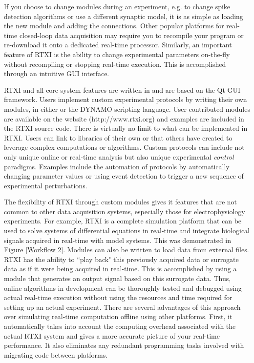  If you choose to change modules during an experiment, e.g. to change spike detection algorithms or use a different synaptic model, it is as simple as loading the new module and adding the connections. Other popular platforms for real-time closed-loop data acquisition may require you to recompile your program or re-download it onto a dedicated real-time processor. Similarly, an important feature of RTXI is the ability to change experimental parameters on-the-fly without recompiling or stopping real-time execution. This is accomplished through an intuitive GUI interface.

RTXI and all core system features are written in \cpp and are based on the Qt GUI framework. Users implement custom experimental protocols by writing their own modules, in either \cpp or the DYNAMO scripting language. User-contributed modules are available on the website (http://www.rtxi.org) and examples are included in the RTXI source code. There is virtually no limit to what can be implemented in RTXI. Users can link to \cpp libraries of their own or that others have created to leverage complex computations or algorithms. Custom protocols can include not only unique online or real-time analysis but also unique experimental \emph{control} paradigms. Examples include the automation of protocols by automatically changing parameter values or using event detection to trigger a new sequence of experimental perturbations. 

The flexibility of RTXI through custom \cpp modules gives it features that are not common to other data acquisition systems, especially those for electrophysiology experiments. For example, RTXI is a complete simulation platform that can be used to solve systems of differential equations in real-time and integrate biological signals acquired in real-time with model systems. This was demonstrated in Figure \ref{Workflow 2}. Modules can also be written to load data from external files. RTXI has the ability to ``play back" this previously acquired data or surrogate data as if it were being acquired in real-time. This is accomplished by using a module that generates an output signal based on this surrogate data. Thus, online algorithms in development can be thoroughly tested and debugged using actual real-time execution without using the resources and time required for setting up an actual experiment. There are several advantages of this approach over simulating real-time computation offline using other platforms. First, it automatically takes into account the computing overhead associated with the actual RTXI system and gives a more accurate picture of your real-time performance. It also eliminates any redundant programming tasks involved with migrating code between platforms.

